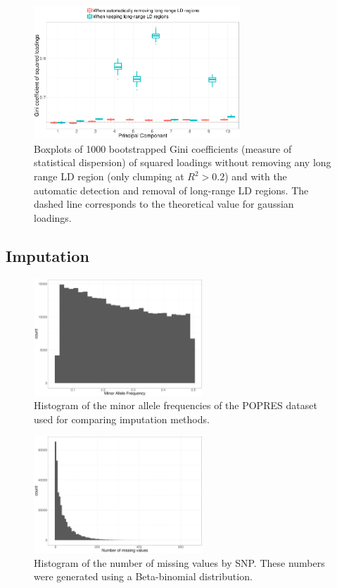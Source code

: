 \documentclass{bioinfo}
\begin{document}
\begin{figure}[!tpb]
\centerline{\includegraphics[width=220pt]{gini}}
\caption{Boxplots of 1000 bootstrapped Gini coefficients (measure of statistical dispersion) of squared loadings without removing any long range LD region (only clumping at $R^2 > 0.2$) and with the automatic detection and removal of long-range LD regions. The dashed line corresponds to the theoretical value for gaussian loadings.}\label{fig:gini}
\end{figure}

\subsection{Imputation}

\begin{figure}[!tpb]
\centerline{\includegraphics[width=180pt]{hist-maf}}
\caption{Histogram of the minor allele frequencies of the POPRES dataset used for comparing imputation methods.}\label{fig:maf}
\end{figure}

\begin{figure}[!tpb]
\centerline{\includegraphics[width=180pt]{hist-NA}}
\caption{Histogram of the number of missing values by SNP. These numbers were generated using a Beta-binomial distribution.}\label{fig:NA}
\end{figure}
\end{document}
